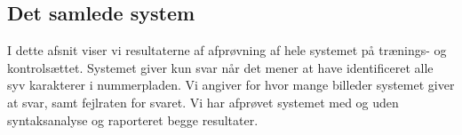 \begin{comment}
Syntaks analyse: Hvilke hits bliver valgt på hitlisterne af syntaksanalysen (sæt maxhitno højt):

\begin{tabular}{|l|c|}\hline
\multicolumn{2}{|l|}{Træningssæt} \\\hline
Hitnr. & Valgt \\\hline
1 & 95,4\% \\\hline
2 & 3\% \\\hline
3 & 0\% \\\hline
4 & 0\% \\\hline
5 & 0\% \\\hline
6 & 0\% \\\hline \end{tabular}

\begin{tabular}{|l|c|}\hline
\multicolumn{2}{|l|}{Kontrolsæt} \\\hline
Hitnr. & Valgt \\\hline
1 & 92,9\% \\\hline
2 & 0\% \\\hline
3 & 0\% \\\hline
4 & 0\% \\\hline
5 & 0\% \\\hline
6 & 0\% \\\hline \end{tabular}

\end{comment} %







\subsection{Det samlede system}
I dette afsnit viser vi resultaterne af afprøvning af hele systemet på trænings- og kontrolsættet. Systemet giver kun svar når det mener at have identificeret alle syv karakterer i nummerpladen. Vi angiver for hvor mange billeder systemet giver at svar, samt fejlraten for svaret. Vi har afprøvet systemet med og uden syntaksanalyse og raporteret begge resultater.

